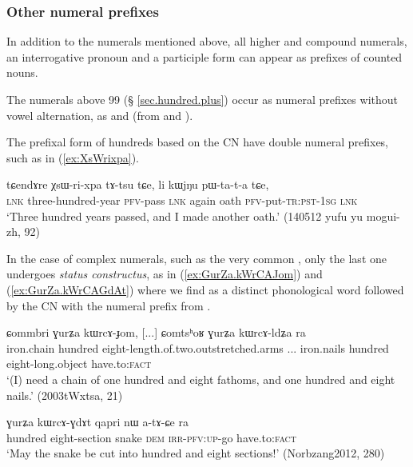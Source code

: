 \subsubsection{Other numeral prefixes} \label{sec:other.numeral.prefixes}
In addition to the numerals mentioned above, all higher and compound numerals, an interrogative pronoun and a participle form can appear as prefixes of counted nouns.

The numerals above 99 (§ \ref{sec.hundred.plus}) occur as numeral prefixes without vowel alternation, as  and  (from  and ). 

The prefixal form of hundreds based on the CN  have double numeral prefixes, such as  in (\ref{ex:XsWrixpa}).

\begin{exe}
\ex \label{ex:XsWrixpa}
\gll tɕendɤre χsɯ-ri-xpa tɤ-tsu tɕe, li kɯjŋu pɯ-ta-t-a tɕe, \\
 \textsc{lnk} three-hundred-year \textsc{pfv}-pass \textsc{lnk} again oath \textsc{pfv}-put-\textsc{tr}:\textsc{pst}-\textsc{1sg} \textsc{lnk} \\
\glt `Three hundred years passed, and I made another oath.' (140512 yufu yu mogui-zh, 92)
\end{exe}

In the case of complex numerals, such as the very common , only the last one undergoes \textit{status constructus}, as in (\ref{ex:GurZa.kWrCAJom}) and (\ref{ex:GurZa.kWrCAGdAt}) where we find  as a distinct phonological word followed by the CN with the numeral prefix  from .

\begin{exe}
\ex \label{ex:GurZa.kWrCAJom}
\gll ɕommbri ɣurʑa kɯrcɤ-ɟom, [...] ɕomtsʰoʁ ɣurʑa kɯrcɤ-ldʑa ra \\
 iron.chain hundred eight-length.of.two.outstretched.arms ... iron.nails hundred eight-long.object have.to:\textsc{fact} \\
\glt  `(I) need a chain of one hundred and eight fathoms, and one hundred and eight nails.' (2003tWxtsa, 21)
\end{exe}

\begin{exe}
\ex \label{ex:GurZa.kWrCAGdAt}
\gll  ɣurʑa kɯrcɤ-ɣdɤt qapri nɯ a-tɤ-ɕe ra \\
 hundred eight-section snake \textsc{dem} \textsc{irr}-\textsc{pfv}:\textsc{up}-go have.to:\textsc{fact} \\
\glt `May the snake be cut into hundred and eight sections!' (Norbzang2012,  280)
\end{exe}

